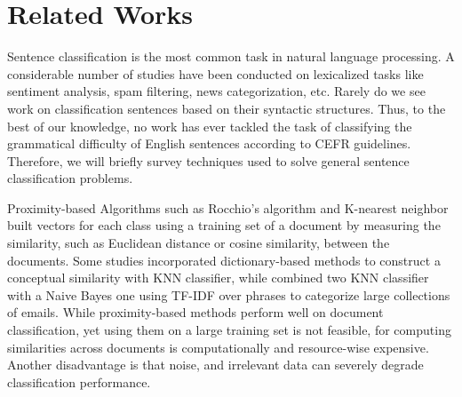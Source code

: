 
\section{Related Works}
\label{sec:research_background}

Sentence classification is the most common task in natural language processing. A considerable number of studies \citep{liu2012survey, pang2002thumbs, stamatatos2009survey} have been conducted on lexicalized tasks like sentiment analysis, spam filtering, news categorization, etc. Rarely do we see work on classification sentences based on their syntactic structures. Thus, to the best of our knowledge, no work has ever tackled the task of classifying the grammatical difficulty of English sentences according to CEFR guidelines. Therefore, we will briefly survey techniques used to solve general sentence classification problems. 

Proximity-based Algorithms such as Rocchio's algorithm \citep{rocchio1971relevance}  and K-nearest neighbor \citep{tam_comparative_2002} built vectors for each class using a training set of a document by measuring the similarity, such as Euclidean distance or cosine similarity, between the documents. Some studies \citep{bang_hierarchical_2006} incorporated dictionary-based methods to construct a conceptual similarity with KNN classifier, while \citep{chang_using_2009} combined two KNN classifier with a Naive Bayes one using TF-IDF over phrases to categorize large collections of emails. While proximity-based methods perform well on document classification, yet using them on a large training set is not feasible, for computing similarities across documents is computationally and resource-wise expensive. Another disadvantage is that noise, and irrelevant data can severely degrade classification performance.

